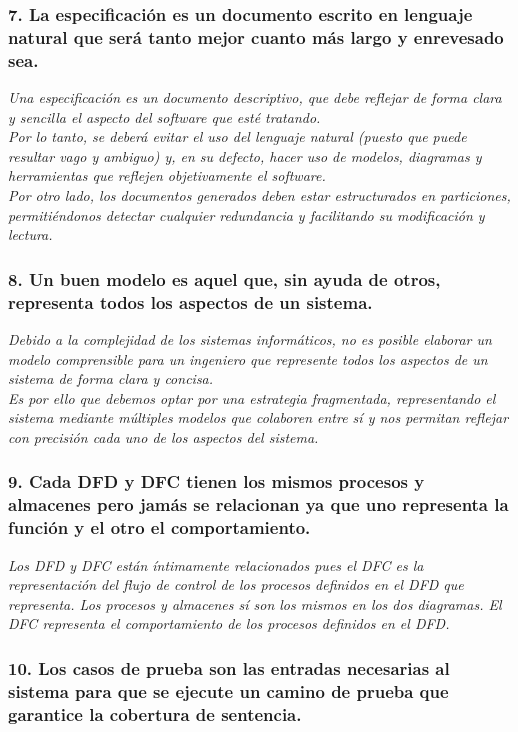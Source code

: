 \subsubsection*{7. La especificación es un documento escrito en lenguaje natural que será tanto mejor cuanto más largo y enrevesado sea.}
\textit{Una especificación es un documento descriptivo, que debe reflejar de forma clara y sencilla el aspecto del software que esté tratando.\\
Por lo tanto, se deberá evitar el uso del lenguaje natural (puesto que puede resultar vago y ambiguo) y, en su defecto, hacer uso de modelos, diagramas y herramientas que reflejen objetivamente el software.\\
Por otro lado, los documentos generados deben estar estructurados en particiones, permitiéndonos detectar cualquier redundancia y facilitando su modificación y lectura.
}

\subsubsection*{8. Un buen modelo es aquel que, sin ayuda de otros, representa todos los aspectos de un sistema.}
\textit{Debido a la complejidad de los sistemas informáticos, no es posible elaborar un modelo comprensible para un ingeniero que represente todos los aspectos de un sistema de forma clara y concisa.
\\
Es por ello que debemos optar por una estrategia fragmentada, representando el sistema mediante múltiples modelos que colaboren entre sí y nos permitan reflejar con precisión cada uno de los aspectos del sistema.
}

\subsubsection*{9. Cada DFD y DFC tienen los mismos procesos y almacenes pero jamás se relacionan ya que uno representa la función y el otro el comportamiento.} %
\textit{Los DFD y DFC están íntimamente relacionados pues el DFC es la representación del flujo de control de los procesos definidos en el DFD que representa. Los procesos y almacenes sí son los mismos en los dos diagramas. El DFC representa el comportamiento de los procesos definidos en el DFD.
}

\subsubsection*{10. Los casos de prueba son las entradas necesarias al sistema para que se ejecute un camino de prueba que garantice la cobertura de sentencia.}

